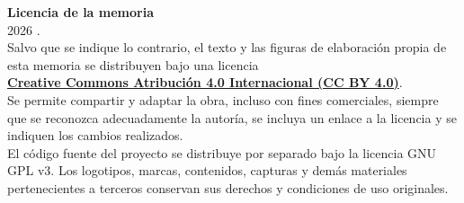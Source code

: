 \clearpage
\thispagestyle{empty}
\vspace*{\fill}

\begin{center}
    {\large\textbf{Licencia de la memoria}}\\[1.5em]

    \textcopyright{} 2026 \nombreautor.\\[1em]

    Salvo que se indique lo contrario, el texto y las figuras de elaboración propia de esta memoria se distribuyen bajo una licencia\\[0.5em]
    \href{https://creativecommons.org/licenses/by/4.0/}{\textbf{Creative Commons Atribución 4.0 Internacional (CC BY 4.0)}}.\\[1em]

    Se permite compartir y adaptar la obra, incluso con fines comerciales, siempre que se reconozca adecuadamente la autoría, se incluya un enlace a la licencia y se indiquen los cambios realizados.\\[1em]

    El código fuente del proyecto se distribuye por separado bajo la licencia GNU GPL v3. Los logotipos, marcas, contenidos, capturas y demás materiales pertenecientes a terceros conservan sus derechos y condiciones de uso originales.
\end{center}

\vspace*{\fill}
\clearpage

